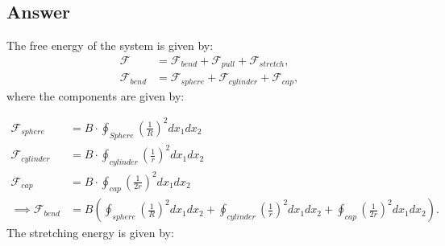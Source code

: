\documentclass[a4paper]{article}
\begin{document}
\subsection*{Answer}
The free energy of the system is given by:
\begin{align*}
    \mathcal{F} &= \mathcal{F}_{bend} + \mathcal{F}_{pull} + \mathcal{F}_{stretch},\\
    \mathcal{F}_{bend} &= \mathcal{F}_{sphere} + \mathcal{F}_{cylinder} + \mathcal{F}_{cap},
\end{align*}where the components are given by:
\begin{comment}
\begin{align*}
    \mathcal{F}_{sphere} &= B\cdot\oint_{Sphere} \left(\frac{1}{R} - \frac{1}{L}\right)^2dx_1dx_2\\
    &= \frac{4\pi B}{2}\left(\frac{1}{R} - \frac{1}{L}\right)^2,\\
    \mathcal{F}_{cylinder} &= B\cdot\oint_{cylinder} \left(\frac{1}{R} - \frac{1}{L}\right)^2dx_1dx_2\\
    &=\frac{2\pi B}{L}\left(\frac{1}{R} - \frac{1}{L}\right)^2,\\
    \mathcal{F}_{cap} &= B\cdot\oint_{cap} \left(\frac{1}{R} - \frac{1}{L}\right)^2dx_1dx_2\\
    &=\frac{2\pi B}{R}\left(\frac{1}{R} - \frac{1}{L}\right)^2\\
    \implies \mathcal{F}_{bend} &= \frac{4\pi B}{2}\left(\frac{1}{R} - \frac{1}{L}\right)^2+\frac{2\pi B}{L}\left(\frac{1}{R} - \frac{1}{L}\right)^2 + \frac{2\pi B}{R}\left(\frac{1}{R} - \frac{1}{L}\right)^2
\end{align*}
\end{comment}
\begin{align*}
    \mathcal{F}_{sphere} &= B\cdot\oint_{Sphere} \left(\frac{1}{R} \right)^2dx_1dx_2\\
    \mathcal{F}_{cylinder} &= B\cdot\oint_{cylinder} \left(\frac{1}{r}\right)^2dx_1dx_2\\
    \mathcal{F}_{cap} &= B\cdot\oint_{cap} \left(\frac{1}{2r}\right)^2dx_1dx_2\\
    \implies \mathcal{F}_{bend} &= B\left(\oint_{sphere}\left(\frac{1}{R}\right)^2dx_1dx_2+\oint_{cylinder}\left(\frac{1}{r}\right)^2dx_1dx_2 + \oint_{cap}\left(\frac{1}{2r}\right)^2dx_1dx_2\right).
\end{align*}The stretching energy is given by:
\end{document}
